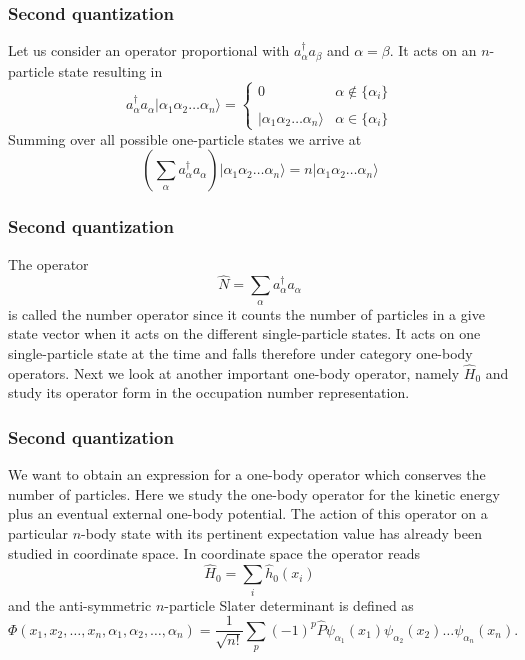 \documentclass{beamer}
\begin{document}
\begin{frame}
\frametitle{Second quantization}

\begin{block}{}
Let us consider an operator proportional with $a_\alpha^{\dagger} a_\beta$ and 
$\alpha=\beta$. It acts on an $n$-particle state 
resulting in
\begin{equation}
	a_\alpha^{\dagger} a_\alpha |\alpha_1\alpha_2 \dots \alpha_{n}\rangle = 
	\begin{cases}
		0  &\alpha \notin \{\alpha_i\} \\
		\\
		|\alpha_1\alpha_2 \dots \alpha_{n}\rangle & \alpha \in \{\alpha_i\}
	\end{cases}
\end{equation}
Summing over all possible one-particle states we arrive at
\begin{equation}
	\left( \sum_\alpha a_\alpha^{\dagger} a_\alpha \right) |\alpha_1\alpha_2 \dots \alpha_{n}\rangle = 
	n |\alpha_1\alpha_2 \dots \alpha_{n}\rangle \label{eq:2-21}
\end{equation}
\end{block}
\end{frame}

\begin{frame}
\frametitle{Second quantization}

\begin{block}{}
The operator 
\begin{equation}
	\hat{N} = \sum_\alpha a_\alpha^{\dagger} a_\alpha \label{eq:2-22}
\end{equation}
is called the number operator since it counts the number of particles in a give state vector when it acts 
on the different single-particle states.  It acts on one single-particle state at the time and falls 
therefore under category one-body operators.
Next we look at another important one-body operator, namely $\hat{H}_0$ and study its operator form in the 
occupation number representation.
\end{block}
\end{frame}

\begin{frame}
\frametitle{Second quantization}

\begin{block}{}
We want to obtain an expression for a one-body operator which conserves the number of particles.
Here we study the one-body operator for the kinetic energy plus an eventual external one-body potential.
The action of this operator on a particular $n$-body state with its pertinent expectation value has already
been studied in coordinate  space.
In coordinate space the operator reads
\begin{equation}
	\hat{H}_0 = \sum_i \hat{h}_0(x_i) \label{eq:2-23}
\end{equation}
and the anti-symmetric $n$-particle Slater determinant is defined as 
\[
\Phi(x_1, x_2,\dots ,x_n,\alpha_1,\alpha_2,\dots, \alpha_n)= \frac{1}{\sqrt{n!}} \sum_p (-1)^p\hat{P}\psi_{\alpha_1}(x_1)\psi_{\alpha_2}(x_2) \dots \psi_{\alpha_n}(x_n).
\]
\end{block}
\end{frame}
\end{document}
